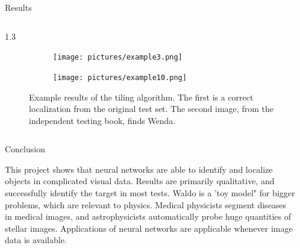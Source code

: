 \documentclass[final]{beamer}
\newlength{\onecolwid}
\newlength{\twocolwid}
\begin{document}
\begin{frame}[t]
\begin{columns}[t]
\begin{column}{\twocolwid}
\begin{alertblock}{Results}
\begin{columns}[t,totalwidth=0.95\twocolwid]
\begin{column}{1.3\onecolwid}\vspace{0in}

\begin{figure}
    \centering
        
        \begin{subfigure}{\textwidth}
        \texttt{[image: pictures/example3.png]} \\
        \end{subfigure}
        
        \begin{subfigure}{\textwidth}
        \texttt{[image: pictures/example10.png]}
        \end{subfigure}

        
        
    \caption{Example results of the tiling algorithm. The first is a correct localization from the original test set. The second image, from the independent testing book, finds Wenda.}
    \label{fig:examples}
\end{figure}



\end{column}
\end{columns}
\end{alertblock}


\begin{columns}[t,totalwidth=\twocolwid] %
\begin{column}{\onecolwid}\vspace{-.6in}


\begin{block}{Conclusion}

This project shows that neural networks are able to identify and localize objects in complicated visual data. Results are primarily qualitative, and successfully identify the target in most tests. Waldo is a 'toy model" for bigger problems, which are relevant to physics. Medical physicists segment diseases in medical images, and astrophysicists automatically probe huge quantities of stellar images. Applications of neural networks are applicable whenever image data is available.

\end{block}




\end{column}

\begin{column}{\onecolwid}\vspace{-.6in}




\end{column}
\end{columns}
\end{column}
\end{columns}
\end{frame}
\end{document}
